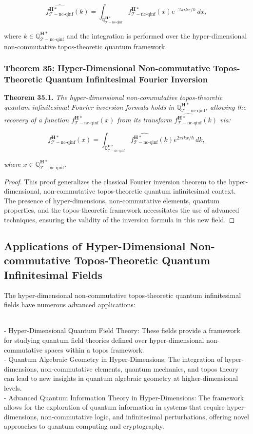 \documentclass{article}
\begin{document}
\[
\widehat{f_{\mathcal{T}-\text{nc-qinf}}^{\mathbf{H}*}}(k) = \int_{\mathbb{Q}_{\mathcal{T}-\text{nc-qinf}}^{\mathbf{H}*}} f_{\mathcal{T}-\text{nc-qinf}}^{\mathbf{H}*}(x) e^{-2\pi i k x / \hbar} \, dx,
\]

where \(k \in \mathbb{Q}_{\mathcal{T}-\text{nc-qinf}}^{\mathbf{H}*}\) and the integration is performed over the hyper-dimensional non-commutative topos-theoretic quantum framework.

\subsubsection{Theorem 35: Hyper-Dimensional Non-commutative Topos-Theoretic Quantum Infinitesimal Fourier Inversion}
\textbf{Theorem 35.1.} \textit{The hyper-dimensional non-commutative topos-theoretic quantum infinitesimal Fourier inversion formula holds in \(\mathbb{Q}_{\mathcal{T}-\text{nc-qinf}}^{\mathbf{H}*}\), allowing the recovery of a function \(f_{\mathcal{T}-\text{nc-qinf}}^{\mathbf{H}*}(x)\) from its transform \(\widehat{f_{\mathcal{T}-\text{nc-qinf}}^{\mathbf{H}*}}(k)\) via:}

\[
f_{\mathcal{T}-\text{nc-qinf}}^{\mathbf{H}*}(x) = \int_{\mathbb{Q}_{\mathcal{T}-\text{nc-qinf}}^{\mathbf{H}*}} \widehat{f_{\mathcal{T}-\text{nc-qinf}}^{\mathbf{H}*}}(k) e^{2\pi i k x / \hbar} \, dk,
\]

\textit{where \(x \in \mathbb{Q}_{\mathcal{T}-\text{nc-qinf}}^{\mathbf{H}*}\).}

\begin{proof}
This proof generalizes the classical Fourier inversion theorem to the hyper-dimensional, non-commutative topos-theoretic quantum infinitesimal context. The presence of hyper-dimensions, non-commutative elements, quantum properties, and the topos-theoretic framework necessitates the use of advanced techniques, ensuring the validity of the inversion formula in this new field.
\end{proof}

\subsection{Applications of Hyper-Dimensional Non-commutative Topos-Theoretic Quantum Infinitesimal Fields}
The hyper-dimensional non-commutative topos-theoretic quantum infinitesimal fields have numerous advanced applications:

{\ }\\
- Hyper-Dimensional Quantum Field Theory: These fields provide a framework for studying quantum field theories defined over hyper-dimensional non-commutative spaces within a topos framework.
{\ }\\
- Quantum Algebraic Geometry in Hyper-Dimensions: The integration of hyper-dimensions, non-commutative elements, quantum mechanics, and topos theory can lead to new insights in quantum algebraic geometry at higher-dimensional levels.
{\ }\\
- Advanced Quantum Information Theory in Hyper-Dimensions: The framework allows for the exploration of quantum information in systems that require hyper-dimensions, non-commutative logic, and infinitesimal perturbations, offering novel approaches to quantum computing and cryptography.
\end{document}
